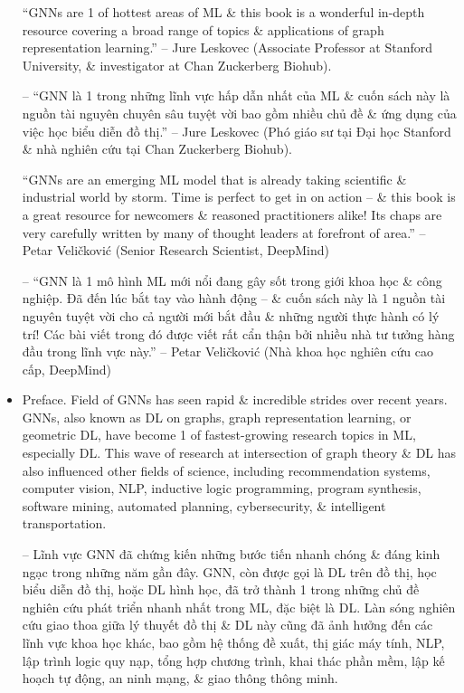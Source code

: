 \documentclass{article}
\begin{document}
\begin{itemize}
    ``GNNs are 1 of hottest areas of ML \& this book is a wonderful in-depth resource covering a broad range of topics \& applications of graph representation learning.'' -- Jure Leskovec (Associate Professor at Stanford University, \& investigator at Chan Zuckerberg Biohub).

    -- ``GNN là 1 trong những lĩnh vực hấp dẫn nhất của ML \& cuốn sách này là nguồn tài nguyên chuyên sâu tuyệt vời bao gồm nhiều chủ đề \& ứng dụng của việc học biểu diễn đồ thị.'' -- Jure Leskovec (Phó giáo sư tại Đại học Stanford \& nhà nghiên cứu tại Chan Zuckerberg Biohub).

    ``GNNs are an emerging ML model that is already taking scientific \& industrial world by storm. Time is perfect to get in on action -- \& this book is a great resource for newcomers \& reasoned practitioners alike! Its chaps are very carefully written by many of thought leaders at forefront of area.'' -- Petar Veličković (Senior Research Scientist, DeepMind)

    -- ``GNN là 1 mô hình ML mới nổi đang gây sốt trong giới khoa học \& công nghiệp. Đã đến lúc bắt tay vào hành động -- \& cuốn sách này là 1 nguồn tài nguyên tuyệt vời cho cả người mới bắt đầu \& những người thực hành có lý trí! Các bài viết trong đó được viết rất cẩn thận bởi nhiều nhà tư tưởng hàng đầu trong lĩnh vực này.'' -- Petar Veličković (Nhà khoa học nghiên cứu cao cấp, DeepMind)
    \item {\sf Preface.} Field of GNNs has seen rapid \& incredible strides over recent years. GNNs, also known as DL on graphs, graph representation learning, or geometric DL, have become 1 of fastest-growing research topics in ML, especially DL. This wave of research at intersection of graph theory \& DL has also influenced other fields of science, including recommendation systems, computer vision, NLP, inductive logic programming, program synthesis, software mining, automated planning, cybersecurity, \& intelligent transportation.

    -- Lĩnh vực GNN đã chứng kiến những bước tiến nhanh chóng \& đáng kinh ngạc trong những năm gần đây. GNN, còn được gọi là DL trên đồ thị, học biểu diễn đồ thị, hoặc DL hình học, đã trở thành 1 trong những chủ đề nghiên cứu phát triển nhanh nhất trong ML, đặc biệt là DL. Làn sóng nghiên cứu giao thoa giữa lý thuyết đồ thị \& DL này cũng đã ảnh hưởng đến các lĩnh vực khoa học khác, bao gồm hệ thống đề xuất, thị giác máy tính, NLP, lập trình logic quy nạp, tổng hợp chương trình, khai thác phần mềm, lập kế hoạch tự động, an ninh mạng, \& giao thông thông minh.


\end{itemize}
\end{document}
